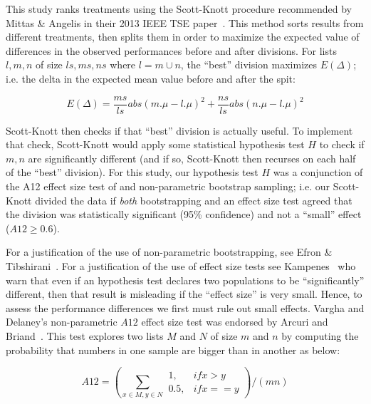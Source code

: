\documentclass[10pt,journal,compsoc]{IEEEtran}
\begin{document}
This study ranks treatments using the Scott-Knott procedure recommended by Mittas \& Angelis in their 2013 IEEE TSE paper~\cite{mittas2013ranking}. This method
sorts results from different treatments, then splits them in order to maximize the expected value of differences  in the observed performances
before and after divisions. For lists $l,m,n$ of size $\mathit{ls},\mathit{ms},\mathit{ns}$ where $l=m\cup n$, the ``best'' division maximizes $E(\Delta)$; i.e. the delta in the expected mean value before and after the spit: 

 \[E(\Delta)=\frac{ms}{ls}abs(m.\mu - l.\mu)^2 + \frac{ns}{ls}abs(n.\mu - l.\mu)^2\]

Scott-Knott then checks if that ``best'' division is actually useful. To implement that check, Scott-Knott would apply some statistical hypothesis test $H$ to check if $m,n$ are significantly different (and if so, Scott-Knott then recurses on each half of the ``best'' division). For this study, our hypothesis test $H$ was a conjunction of the A12 effect size test of and non-parametric bootstrap sampling; i.e. our Scott-Knott divided the data if {\em both} bootstrapping and an effect size test agreed that
the division was statistically significant (95\% confidence) and not a ``small'' effect ($A12 \ge 0.6$).

For a justification of the use of non-parametric bootstrapping, see Efron \& Tibshirani~\cite[p220-223]{efron94}. For a justification of the use of effect size tests see Kampenes~\cite{kampenes2007} who  warn that even if an hypothesis test declares two populations to be ``significantly'' different, then that result is misleading if the ``effect size'' is very small. Hence, to assess the performance differences  we first must rule out small effects. Vargha and Delaney's non-parametric $A12$ effect size test was endorsed by Arcuri and Briand~\cite{arcuri2011practical}.
This test 
explores two lists $M$ and $N$ of size $m$ and $n$ by computing the probability that numbers in one sample are bigger than in another as below:

\[
    A12 = \left(\sum_{x\in M, y \in N} \begin{array}{lr}
        1, & \mathit{if } x > y\\
        0.5, & \mathit{if } x == y
        \end{array}\right) / (mn)
\]
\end{document}
